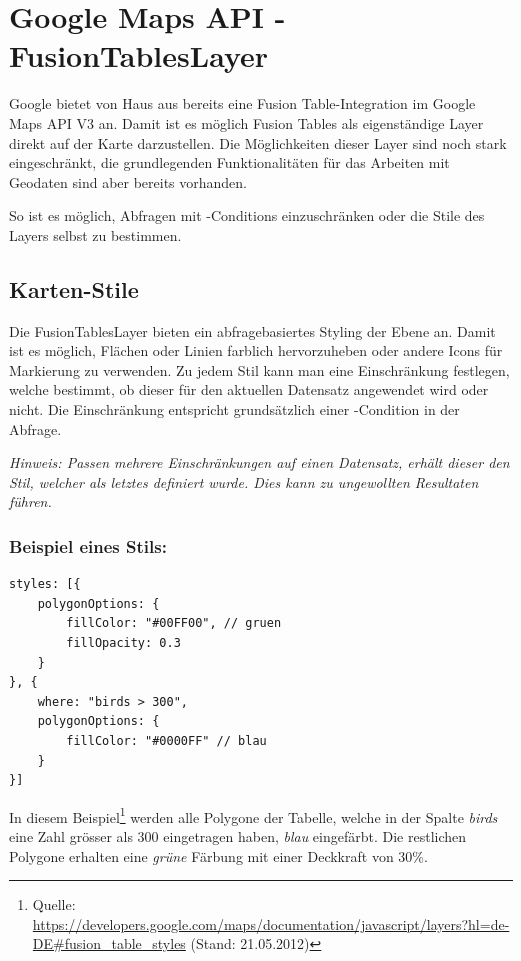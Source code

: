 \section{Google Maps API - FusionTablesLayer}
\label{gmap-api-fusiontableslayer}
Google bietet von Haus aus bereits eine Fusion Table-Integration im Google Maps \gls{API} V3 an. Damit ist es möglich Fusion Tables als eigenständige Layer direkt auf der Karte darzustellen.
Die Möglichkeiten dieser Layer sind noch stark eingeschränkt, die grundlegenden Funktionalitäten für das Arbeiten mit Geodaten sind aber bereits vorhanden.

So ist es möglich, Abfragen mit -Conditions einzuschränken oder die Stile des Layers selbst zu bestimmen.

\subsection{Karten-Stile}
\label{fusiontableslayer-styles}
Die FusionTablesLayer bieten ein abfragebasiertes Styling der Ebene an. Damit ist es möglich, Flächen oder Linien farblich hervorzuheben oder andere Icons für Markierung zu verwenden. Zu jedem Stil kann man eine Einschränkung festlegen, welche bestimmt, ob dieser für den aktuellen Datensatz angewendet wird oder nicht. Die Einschränkung entspricht grundsätzlich einer -Condition in der Abfrage.

\emph{Hinweis: Passen mehrere Einschränkungen auf einen Datensatz, erhält dieser den Stil, welcher als letztes definiert wurde. Dies kann zu ungewollten Resultaten führen.}

\subsubsection{Beispiel eines Stils:}
\lstset{language=JavaScript}
\begin{lstlisting}[caption=Beispiel eines FusionTablesLayer-Stylings, label=fusiontableslayers-styles-example]
styles: [{
	polygonOptions: {
		fillColor: "#00FF00", // gruen
		fillOpacity: 0.3
	}
}, {
	where: "birds > 300",
	polygonOptions: {
		fillColor: "#0000FF" // blau
	}
}]
\end{lstlisting}

In diesem Beispiel\footnote{Quelle: \url{https://developers.google.com/maps/documentation/javascript/layers?hl=de-DE\#fusion_table_styles} (Stand: 21.05.2012)} werden alle Polygone der Tabelle, welche in der Spalte \emph{birds} eine Zahl grösser als 300 eingetragen haben, \emph{blau} eingefärbt. Die restlichen Polygone erhalten eine \emph{grüne} Färbung mit einer Deckkraft von 30\%.

